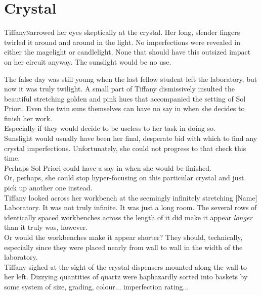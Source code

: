 \chapter{Crystal}

\lettrine{Tiffany} narrowed her eyes skeptically at the crystal. 
Her long, slender fingers twirled it around and around in the light.
No imperfections were revealed in either the magelight or candlelight.
None that should have this outsized impact on her circuit anyway. 
The sunslight would be no use.

The false day was still young when the last fellow student left the laboratory, but now it was truly twilight.
A small part of Tiffany dismissively insulted the beautiful stretching golden and pink hues that accompanied the setting of Sol Priori. 
Even the twin suns themselves can have no say in when she decides to finish her work.\\

Especially if they would decide to be useless to her task in doing so.\\

Sunslight would usually have been her final, desperate bid with which to find any crystal imperfections. 
Unfortunately, she could not progress to that check this time.\\

Perhaps Sol Priori could have a say in when she would be finished.\\

Or, perhaps, she could stop hyper-focusing on this particular crystal and just pick up another one instead.\\

Tiffany looked across her workbench at the seemingly infinitely stretching [Name] Laboratory.
It was not truly infinite.
It was just a long room.
The several rows of identically spaced workbenches across the length of it did make it appear \textit{longer} than it truly was, however.\\

Or would the workbenches make it appear shorter? They should, technically, especially since they were placed nearly from wall to wall in the width of the laboratory.\\

Tiffany sighed at the sight of the crystal dispensers mounted along the wall to her left.
Dizzying quantities of quartz were haphazardly sorted into baskets by some system of size, grading, colour... imperfection rating...\\

